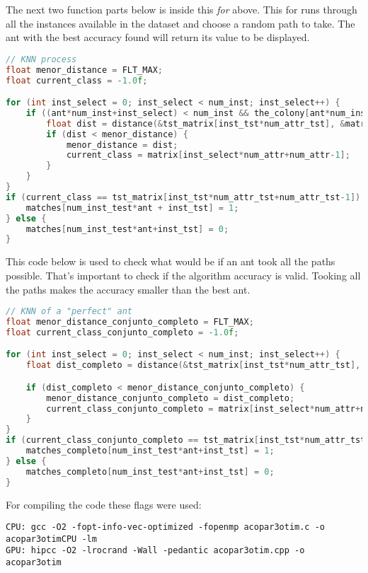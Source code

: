 The next two function parts below is inside this \emph{for} above.
This for runs through all the instances available in the dataset and choose
a random path to take. The ant with the best accuracy found will return its value
to be displayed.

\begin{lstlisting}[language=c++]
// KNN process
float menor_distance = FLT_MAX;
float current_class = -1.0f;

for (int inst_select = 0; inst_select < num_inst; inst_select++) {
    if ((ant*num_inst+inst_select) < num_inst && the_colony[ant*num_inst+inst_select] == 1) {
        float dist = distance(&tst_matrix[inst_tst*num_attr_tst], &matrix[inst_select*num_attr], num_attr_tst-1);
        if (dist < menor_distance) {
            menor_distance = dist;
            current_class = matrix[inst_select*num_attr+num_attr-1];
        }
    }
}
if (current_class == tst_matrix[inst_tst*num_attr_tst+num_attr_tst-1]) {
    matches[num_inst_test*ant + inst_tst] = 1;
} else {
    matches[num_inst_test*ant+inst_tst] = 0;
}
\end{lstlisting}

This code below is used to check what would be if an ant took all the paths possible. That's important to check
if the algorithm accuracy is valid. Tooking all the paths makes the accuracy smaller than the best ant.

\begin{lstlisting}[language=c++]
// KNN of a "perfect" ant
float menor_distance_conjunto_completo = FLT_MAX;
float current_class_conjunto_completo = -1.0f;

for (int inst_select = 0; inst_select < num_inst; inst_select++) {
    float dist_completo = distance(&tst_matrix[inst_tst*num_attr_tst], &matrix[inst_select*num_attr], num_attr_tst-1);

    if (dist_completo < menor_distance_conjunto_completo) {
        menor_distance_conjunto_completo = dist_completo;
        current_class_conjunto_completo = matrix[inst_select*num_attr+num_attr-1];
    }
}
if (current_class_conjunto_completo == tst_matrix[inst_tst*num_attr_tst+num_attr_tst-1]) {
    matches_completo[num_inst_test*ant+inst_tst] = 1;
} else {
    matches_completo[num_inst_test*ant+inst_tst] = 0;
}
\end{lstlisting}

For compiling the code these flags were used:

\begin{lstlisting}
CPU: gcc -O2 -fopt-info-vec-optimized -fopenmp acopar3otim.c -o acopar3otimCPU -lm
GPU: hipcc -O2 -lrocrand -Wall -pedantic acopar3otim.cpp -o acopar3otim
\end{lstlisting}


